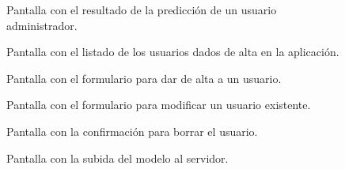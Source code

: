 \begin{figure}[h]
	\caption{Pantalla con el resultado de la predicción de un usuario administrador.}
	\label{fig:resultado}
\end{figure}

\begin{figure}[h]
	\caption{Pantalla con el listado de los usuarios dados de alta en la aplicación.}
	\label{fig:gestionar_usuarios}
\end{figure}

\begin{figure}[h]
	\caption{Pantalla con el formulario para dar de alta a un usuario.}
	\label{fig:agregar_usuario}
\end{figure}

\begin{figure}[h]
	\caption{Pantalla con el formulario para modificar un usuario existente.}
	\label{fig:modificar_usuario}
\end{figure}

\begin{figure}[h]
	\caption{Pantalla con la confirmación para borrar el usuario.}
	\label{fig:eliminar_usuario}
\end{figure}

\begin{figure}[h]
	\caption{Pantalla con la subida del modelo al servidor.}
	\label{fig:modificar_modelo}
\end{figure}
